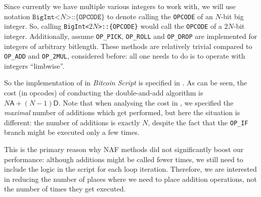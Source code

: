 \documentclass{iacrtrans}
\begin{document}
Since currently we have multiple various integers to work with, we will use notation $\texttt{BigInt<$N$>::\{OPCODE\}}$ to denote calling the \texttt{OPCODE} of an $N$-bit big integer. So, calling \texttt{BigInt<$2N$>::\{OPCODE\}} would call the \texttt{OPCODE} of a $2N$-bit integer. Additionally, assume \texttt{OP\_PICK}, \texttt{OP\_ROLL} and \texttt{OP\_DROP} are implemented for integers of arbitrary bitlength. These methods are relatively trivial compared to \texttt{OP\_ADD} and \texttt{OP\_2MUL}, considered before: all one needs to do is to operate with integers ``limbwise''.

So the implementation of  in \textit{Bitcoin Script} is specified in . As can be seen, the cost (in opcodes) of conducting the double-and-add algorithm is $N\mathsf{A}+(N-1)\mathsf{D}$. Note that when analysing the cost in , we specified the \textit{maximal} number of additions which get performed, but here the situation is different: the number of additions is exactly $N$, despite the fact that the \texttt{OP\_IF} branch might be executed only a few times.

This is the primary reason why NAF methods did not significantly boost our performance: although additions might be called fewer times, we still need to include the logic in the script for each loop iteration. Therefore, we are interested in reducing the number of places where we need to place addition operations, not the number of times they get executed.
\end{document}
